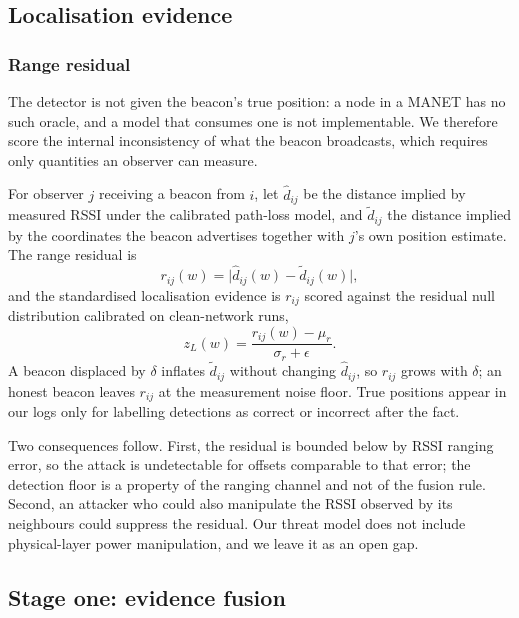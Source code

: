 \subsection{Localisation evidence}

\subsubsection{Range residual}

The detector is not given the beacon's true position: a node in a MANET has no
such oracle, and a model that consumes one is not implementable. We therefore
score the internal inconsistency of what the beacon broadcasts, which requires
only quantities an observer can measure.

For observer $j$ receiving a beacon from $i$, let $\hat d_{ij}$ be the distance
implied by measured RSSI under the calibrated path-loss model, and
$\tilde d_{ij}$ the distance implied by the coordinates the beacon advertises
together with $j$'s own position estimate. The range residual is
\begin{equation}
\label{eq:resid}
r_{ij}(w) = \bigl| \hat d_{ij}(w) - \tilde d_{ij}(w) \bigr|,
\end{equation}
and the standardised localisation evidence is $r_{ij}$ scored against the
residual null distribution calibrated on clean-network runs,
\begin{equation}
\label{eq:zl}
z_L(w) = \frac{r_{ij}(w) - \mu_r}{\sigma_r + \epsilon}.
\end{equation}
A beacon displaced by $\delta$ inflates $\tilde d_{ij}$ without changing
$\hat d_{ij}$, so $r_{ij}$ grows with $\delta$; an honest beacon leaves $r_{ij}$
at the measurement noise floor. True positions appear in our logs only for
labelling detections as correct or incorrect after the fact.

Two consequences follow. First, the residual is bounded below by RSSI ranging
error, so the attack is undetectable for offsets comparable to that error; the
detection floor is a property of the ranging channel and not of the fusion
rule. Second, an attacker who could also manipulate the RSSI observed by its
neighbours could suppress the residual. Our threat model does not include
physical-layer power manipulation, and we leave it as an open gap.

\subsection{Stage one: evidence fusion}

